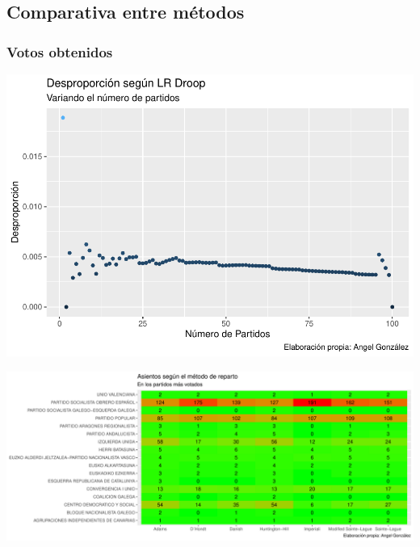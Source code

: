 \documentclass[12pt,a4paper,]{book}
\numberwithin{dummy}{section}
\theoremstyle{ocrenumbox}
\theoremstyle{blacknumex}
\theoremstyle{blacknumbox}
\theoremstyle{ocrenum}
\theoremstyle{ocrenum}
\begin{document}
\hypertarget{comparativa-entre-muxe9todos-14}{%
\subsection{Comparativa entre
métodos}\label{comparativa-entre-muxe9todos-14}}

\hypertarget{votos-obtenidos-14}{%
\subsubsection{Votos obtenidos}\label{votos-obtenidos-14}}

\begin{center}\includegraphics[width=1\linewidth]{figurasR/unnamed-chunk-47-1} \end{center}

\begin{center}\includegraphics[width=1\linewidth]{figurasR/unnamed-chunk-47-2} \end{center}
\end{document}
